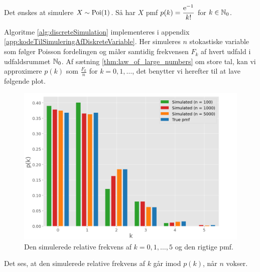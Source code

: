\begin{exmp} \label{exmp:simuleringAfDiskreteVariable}
    Det ønskes at simulere $X \sim \textnormal{Poi}(1)$. Så har $X$ pmf $p(k) = \dfrac{\mathrm{e}^{-1}}{k!}$ for $k \in \mathbb{N}_0$.
    
    Algoritme \ref{alg:discreteSimulation} implementeres i appendix \ref{app:kodeTilSimuleringAfDiskreteVariable}. Her simuleres $n$ stokastiske variable som følger Poisson fordelingen og måler samtidig frekvensen $F_k$ af hvert udfald i udfaldsrummet $\mathbb{N}_0$.
    Af sætning \ref{thm:law_of_large_numbers} om store tal, kan vi approximere $p(k)$ som $\frac{F_k}{n}$ for $k = 0, 1, \ldots$, det benytter vi herefter til at lave følgende plot. 
    \begin{figure}[H]
        \centering
        \includegraphics[scale=0.5]{fig/img/poisson.png} 
        \caption{Den simulerede relative frekvens af $k = 0, 1, \ldots, 5$ og den rigtige pmf.}
        \label{fig:simuleringAfPoisson}
    \end{figure}
    Det ses, at den simulerede relative frekvens af $k$ går imod $p(k)$, når $n$ vokser.
\end{exmp}


